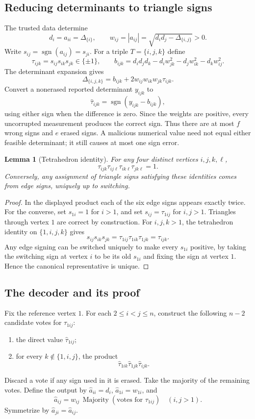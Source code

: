 \documentclass[11pt,a4paper]{article}
\newtheorem{lemma}[theorem]{Lemma}
\theoremstyle{definition}\newtheorem{definition}[theorem]{Definition}
\theoremstyle{remark}\newtheorem{remark}[theorem]{Remark}
\numberwithin{equation}{section}
\begin{document}
\subsection{Reducing determinants to triangle signs}\label{S02-sec-2}
The trusted data determine
\[
 d_i=a_{ii}=\Delta_{\{i\}},\qquad
 w_{ij}=|a_{ij}|=\sqrt{d_id_j-\Delta_{\{i,j\}}}>0.
\]
Write $s_{ij}=\operatorname{sgn}(a_{ij})=s_{ji}$. For a triple $T=\{i,j,k\}$ define
\[
 \tau_{ijk}=s_{ij}s_{ik}s_{jk}\in\{\pm1\},
 \qquad
 b_{ijk}=d_id_jd_k-d_iw_{jk}^2-d_jw_{ik}^2-d_kw_{ij}^2.
\]
The determinant expansion gives
\begin{equation}\label{S02-eq:triangle}
 \Delta_{\{i,j,k\}}=b_{ijk}+2w_{ij}w_{ik}w_{jk}\tau_{ijk}.
\end{equation}
Convert a nonerased reported determinant $y_{ijk}$ to
\[
 \widehat\tau_{ijk}=\operatorname{sgn}(y_{ijk}-b_{ijk}),
\]
using either sign when the difference is zero. Since the weights are positive, every uncorrupted measurement produces the correct sign. Thus there are at most $f$ wrong signs and $e$ erased signs. A malicious numerical value need not equal either feasible determinant; it still causes at most one sign error.

\begin{lemma}[Tetrahedron identity]\label{S02-lem:tetra}
For any four distinct vertices $i,j,k,\ell$,
\[
 \tau_{ijk}\tau_{ij\ell}\tau_{ik\ell}\tau_{jk\ell}=1.
\]
Conversely, any assignment of triangle signs satisfying these identities comes from edge signs, uniquely up to switching.
\end{lemma}
\begin{proof}
In the displayed product each of the six edge signs appears exactly twice. For the converse, set $s_{1i}=1$ for $i>1$, and set $s_{ij}=\tau_{1ij}$ for $i,j>1$. Triangles through vertex $1$ are correct by construction. For $i,j,k>1$, the tetrahedron identity on $\{1,i,j,k\}$ gives
\[
 s_{ij}s_{ik}s_{jk}=\tau_{1ij}\tau_{1ik}\tau_{1jk}=\tau_{ijk}.
\]
Any edge signing can be switched uniquely to make every $s_{1i}$ positive, by taking the switching sign at vertex $i$ to be its old $s_{1i}$ and fixing the sign at vertex $1$. Hence the canonical representative is unique.
\end{proof}

\subsection{The decoder and its proof}\label{S02-sec-3}
Fix the reference vertex $1$. For each $2\le i<j\le n$, construct the following $n-2$ candidate votes for $\tau_{1ij}$:
\begin{enumerate}[label=(\alph*)]
 \item the direct value $\widehat\tau_{1ij}$;
 \item for every $k\notin\{1,i,j\}$, the product
 \[
  \widehat\tau_{1ik}\widehat\tau_{1jk}\widehat\tau_{ijk}.
 \]
\end{enumerate}
Discard a vote if any sign used in it is erased. Take the majority of the remaining votes. Define the output by $\widehat a_{ii}=d_i$, $\widehat a_{1i}=w_{1i}$, and
\[
 \widehat a_{ij}=w_{ij}\,\operatorname{Majority}(\text{votes for }\tau_{1ij})
 \quad(i,j>1).
\]
Symmetrize by $\widehat a_{ji}=\widehat a_{ij}$.
\end{document}
